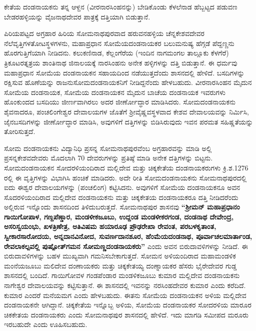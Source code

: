 ಕೇತೆಯ ದಂಡನಾಯಕನು ತನ್ನ ಆಳ್ದನ (ವೀರನಾರಸಿಂಹನನ್ನು) ಬೇಡಿಕೊಂಡು ಕೆಳಲೆನಾಡ ಹೆಬ್ಬಟ್ಟದ ಪಡುವಣ ಬೇಡರಹಳ್ಳಿಯನ್ನು ವೈಜನಾಥದೇವರ ಪಾತ್ರಕ್ಕೆ ದತ್ತಿಯಾಗಿ ಬಿಡುತ್ತಾನೆ.

\vskip 2pt

ಪಿರಿಯಪಟ್ಟದ ಅಗ್ರಹಾರ ಹಿರಿಯ ಸೋಮನಾಥಪುರವಾದ ಹರುವನಹಳ್ಳಿಯ ಚೆನ್ನಕೇಶವದೇವರ ನೆಲೆವೃತ್ತಿಗಳ\break ತೋಟಸ್ಥಳಗಳನು, ಮಹಾಪ್ರಧಾನ ಸೋಮೆಯದಂಡನಾಯಕರ ಬಲುಮನುಷ್ಯ ಹೆಗ್ಗಡೆ ಪೆದ್ದಣ್ಣನು ಹೊರಗುತ್ತಿಗೆಯಾಗಿ ನೀಡಿದನು. ಕಲುಕಣಿನಾಡ, ಕೆಲ್ಲಂಗೆರೆಯ (ಇಂದಿನ ನಾಗಮಂಗಲ ತಾಲ್ಲೂಕು ಕೆಳಗೆರೆ) ತ್ರಿಕೂಟರತ್ನತ್ರಯ ಶಾಂತಿನಾಥ ಜಿನಾಲಯಕ್ಕೆ ನಾರಸಿಂಹನು ಅನೇಕ ಹಳ್ಳಿಗಳನ್ನು ದತ್ತಿ ಬಿಡುತ್ತಾನೆ. ಈ ಧರ್ಮವು ಮಹಾಪ್ರಧಾನ ಸೋಮೆಯ ದಂಡನಾಯಕನ ಸಹಾಯದಿಂದ ನಡೆಯುತ್ತದೆಂದು ಶಾಸನದಲ್ಲಿ ಹೇಳಿದೆ. ಬಸದಿಗಳನ್ನು ರಕ್ಷಿಸುವ ಹೊಣೆಯನ್ನು ರಾಜನು\break ಸೋಮದಂಡನಾಯಕನಿಗೆ ನೀಡಿದ್ದನೆಂದು ಹೇಳಬಹುದು. ವೀರನಾರಸಿಂಹನ ಮೈದುನ ಸೋಮೆಯ ದಂಡನಾಯಕ, ಸೋಮೆಯ ದಂಡನಾಯಕನ ಮೈದುನ ಬಾಚೆಯ ದಂಡನಾಯಕ ಇವರುಗಳು ಹೊಂಕುಂದದ ಬಸದಿಯು ಜೀರ್ಣವಾಗಿರಲು ಅದರ ಜೀರ್ಣೋದ್ಧಾರ ಮಾಡಿಸಿದರು. ಸೋಮದಂಡನಾಯಕನು ಶೈವನಾದರೂ, ಪಂಚಲಿಂಗೇಶ್ವರ ದೇವಾಲಯಗಳ ಜೊತೆಗೆ ಶ‍್ರೀವೈಷ್ಣವಸ್ಥಳವಾದ ಕೇಶವ ದೇವಾಲಯವನ್ನು ನಿರ್ಮಿಸಿ, ಜೈನಬಸದಿಗಳನ್ನು ಜೀರ್ಣೋದ್ಧಾರ ಮಾಡಿಸಿ, ಅವುಗಳಿಗೆ ದತ್ತಿಗಳನ್ನು ಬಿಡಿಸಿರುವುದು ಇವನ ಪರಮತ ಸಹಿಷ್ಣತೆಯನ್ನು ತೋರಿಸುತ್ತದೆ.

\vskip 2pt

ಸೋಮ ದಂಡನಾಯಕನು ವಿದ್ಯಾನಿಧಿ ಪ್ರಸನ್ನ ಸೋಮನಾಥಪುರವೆಂಬ ಅಗ್ರಹಾರವನ್ನು ಮಾಡಿ ಅಲ್ಲಿ ಪ್ರಸನ್ನ\break ಕೇಶವದೇವರು ಮೊದಲಾಗಿ 70 ದೇವರುಗಳನ್ನು ಪ್ರತಿಷ್ಠೆ ಮಾಡಿ ಅನೇಕ ದತ್ತಿಗಳನ್ನು ಬಿಟ್ಟನು. ಸೋಮದಂಡನಾಯಕನ ಸೋದರಳಿಯಂದಿರಾದ ಮಲ್ಲಿದೇವ ಮತ್ತು ಚಿಕ್ಕಕೇತೆಯ ದಂಡನಾಯಕರುಗಳು ಕ್ರಿ.ಶ.1276 ರಲ್ಲಿ ಈ ವೃತ್ತಿಗಳನ್ನು ವಿಭಾಗಿಸಿ ಹಂಚಿಕೆ ಮಾಡಿದರು. ಅದೇ ರೀತಿ ಸೋಮದಂಡನಾಯಕನು ಸೋಮನಾಥಪುರದಲ್ಲಿ ಐದು ಈಶ್ವರ ದೇವಾಲಯಗಳನ್ನು (ಪಂಚಲಿಂಗ) ಕಟ್ಟಿಸಿದನು. ಅವುಗಳಿಗೆ ಸೋಮೆಯ ದಂಡನಾಯಕನೂ ಅವನ ಸೊದರಳಿಯಂದಿರಾದ ಮಲ್ಲಿದೇವ ದಂಡನಾಯಕನು ಮತ್ತು ಚಿಕ್ಕಕೇತಯ ದಂಡನಾಯಕರೂ ದತ್ತಿ ನೀಡಿದರೆಂದು ಅಲ್ಲಿರುವ ಇನ್ನೊಂದು ಶಾಸನದಿಂದ ತಿಳಿದು\-ಬರುತ್ತದೆ. ಸೋಮನಾಥಪುರ ಶಾಸನವು \textbf{“ಶ‍್ರೀಮನ್​ ಮಹಾಪ್ರಧಾನಂ ಗಾಯಿಗೋಪಾಳ, ಗಣ್ದಪೆಣ್ಡಾರ, ಮಂಡಳೀಕಜೂಬು, ಉದ್ದಂಡ ಮಂಡಳೀಕರಗಂಡ, ದಂಡನಾಥ ದೇವೇಂದ್ರ, ಅಸರಿಸ್ವಯಂಭು, ಖಳತ್ರಿಣೇತ್ರ, ಅತಿವಿಷಮ ಹಯಾರೂಢ\general{\break } ಪ್ರೌಢರೇಖಾ ರೇವಂತ, ಪರಬಳಕೃತಾಂತ, ಸ್ವೀಕಾರಸಾರೋದಯ, ಅನ್ನದಾನವಿನೋದ, ಸುವರ್ಣದಾನಶೂರ,\general{\break } ಹೆಂಮೆಯದಂಡನಾಥ, ಪೂರ್ವಾಚಲಮಾರ್ತಾಂಡ, ರೇವಲಾಕಲ್ಪವಲ್ಲಿ ಪುಷ್ಪೋತ್​ಗಮನ ಸೋಮಣ್ಣದಂಡನಾಯಕರು” }ಎಂದು ಅವನ ಬಿರುದಾವಳಿಗಳನ್ನು ನೀಡಿದೆ. ಈ ಬಿರುದಾವಳಿಗಳನ್ನು ಬಹಳ ಮುಖ್ಯವಾಗಿ ಗಮನಿಸಬೇಕಾಗುತ್ತದೆ. ಸೋಮನ ಅಳಿಯಂದಿರಾದ ಮಹಾಮಂಡಳಿಕ ಮಂನೆಯಜೂಬು ಮಲಿದೇವ ದಂಣಾಯಕರು ಮತ್ತು ಚಿಕ್ಕಕೇತಯ್ಯ ದಂಣ್ನಾಯಕರ ಹೆಸರು ಭೈರೇದೇವರ ಗುಡ್ಡ ಶಾಸನದಲ್ಲಿ ಬಂದಿದೆ. ಗಾಯಿಗೋವಳ ಗಂಡಪೆಂಡಾರ ಮಂಡಳಿಕಜೂಬು ಕುಮಾರ ಮಲ್ಲಿದೇವ ದಂಡನಾಯಕನು ನಾಗೇಶ್ವರ ದೇವಾಲಯವನ್ನು ಕಟ್ಟಿಸುತ್ತಾನೆ. ಈ ಶಾಸನದಲ್ಲಿ ಇವನನ್ನು ನರಸಿಂಹದೇವರ ಕುಮಾರ ಎಂದು ಕರೆದಿದೆ. ಕುಮಾರ ಎಂದರೆ ಮನೆಯಮಗ ಎಂದು ಹೇಳಬಹುದು. ಈತನು ಸೋಮೆಯ ದಂಡನಾಯಕನ ಅಳಿಯ ಮಲ್ಲಿದೇವ ದಂಡನಾಯಕನೇ ಆಗಿದ್ದಾನೆ. ಚಿಕ್ಕಕೇತೆಯ ಇನ್ನೊಬ್ಬ ಅಳಿಯ, ಸೋಮೆಯ ದಂಡನಾಯಕರ ಸೋದರಳಿಯ ಮಾರೂರ ಚಿಕಕೇತಯ ದಂಡನಾಯಕರು ಎಂದು ಸೋಮನಾಥಪುರ ಶಾಸನದಲ್ಲಿ ಹೇಳಿದೆ. ಇದು ಮಾಗಡಿ ಸಮೀಪದ ಮರೂರು ಇರಬಹುದೇ ಎಂದು ಊಹಿಸಬಹುದು.

